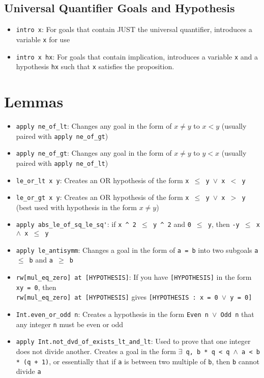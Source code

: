 \documentclass{exam}
\begin{document}
    \subsection*{Universal Quantifier Goals and Hypothesis}
    \begin{itemize}
        \item \verb|intro x|: For goals that contain JUST the universal quantifier, introduces a variable \verb|x| for use 
        \item \verb|intro x hx|: For goals that contain implication, introduces a variable \verb|x| and a hypothesis \verb|hx| such that \verb|x| satisfies the proposition. 
    \end{itemize}
    \section*{Lemmas}
    \begin{itemize}
        \item \verb|apply ne_of_lt|: Changes any goal in the form of $x \neq y$ to $x < y$ (usually paired with \verb|apply ne_of_gt|)
        \item \verb|apply ne_of_gt|: Changes any goal in the form of $x \neq y$ to $y < x$ (usually paired with \verb|apply ne_of_lt|)
        \item \verb|le_or_lt x y|: Creates an OR hypothesis of the form \texttt{x $\leq$ y $\lor$ x $<$ y}
        \item \verb|le_or_gt x y|: Creates an OR hypothesis of the form \texttt{x $\leq$ y $\lor$ x $>$ y} (best used with hypothesis in the form $x \neq y$)
        \item \verb|apply abs_le_of_sq_le_sq'|: if \texttt{x \^{} 2 $\leq$ y \^{} 2} and \texttt{0 $\leq$ y}, then \texttt{-y $\leq$ x $\land$ x $\leq$ y}
        \item \verb|apply le_antisymm|: Changes a goal in the form of \texttt{a = b} into two subgoals \texttt{a $\leq$ b} and \texttt{a $\geq$ b}
        \item \verb|rw[mul_eq_zero] at [HYPOTHESIS]|: If you have \texttt{[HYPOTHESIS]} in the form \texttt{xy = 0}, then \\ \verb|rw[mul_eq_zero] at [HYPOTHESIS]| gives \texttt{[HYPOTHESIS : x = 0 $\lor$ y = 0]}
        \item \verb|Int.even_or_odd n|: Creates a hypothesis in the form \texttt{Even n $\lor$ Odd n} that any integer \texttt{n} must be even or odd
        \item \verb|apply Int.not_dvd_of_exists_lt_and_lt|: Used to prove that one integer does not divide another. Creates a goal in the form \texttt{$\exists$ q, b * q < q $\land$ a < b * (q + 1)}, or essentially that if \texttt{a} is between two multiple of \texttt{b}, then \texttt{b} cannot divide \texttt{a}
    \end{itemize}
\end{document}
